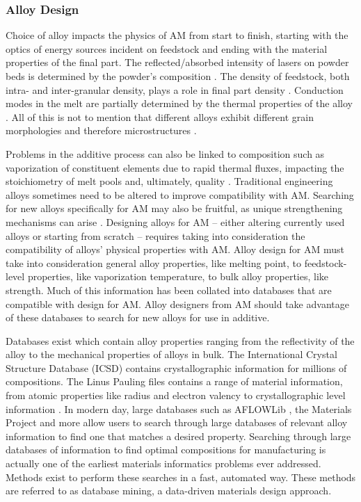 \subsubsection{Alloy Design}
Choice of alloy impacts the physics of AM from start to finish, starting with the optics of energy sources incident on feedstock and ending with the material properties of the final part. The reflected/absorbed intensity of lasers on powder beds is determined by the powder's composition \cite{Boley2016, Trapp2017}. The density of feedstock, both intra- and inter-granular density, plays a role in final part density \cite{Bi2013}. Conduction modes in the melt are partially determined by the thermal properties of the alloy \cite{Martin2017}. All of this is not to mention that different alloys exhibit different grain morphologies and therefore microstructures \cite{Collins2016}. 

Problems in the additive process can also be linked to composition such as vaporization of constituent elements due to rapid thermal fluxes, impacting the stoichiometry of melt pools and, ultimately, quality \cite{Brice2018}. Traditional engineering alloys sometimes need to be altered to improve compatibility with AM. Searching for new alloys specifically for AM may also be fruitful, as unique strengthening mechanisms can arise \cite{Brice2018, Wang2017}. Designing alloys for AM -- either altering currently used alloys or starting from scratch -- requires taking into consideration the compatibility of alloys' physical properties with AM. Alloy design for AM must take into consideration general alloy properties, like melting point, to feedstock-level properties, like vaporization temperature, to bulk alloy properties, like strength. Much of this information has been collated into databases that are compatible with design for AM. Alloy designers from AM should take advantage of these databases to search for new alloys for use in additive. 

Databases exist which contain alloy properties ranging from the reflectivity of the alloy to the mechanical properties of alloys in bulk. The International Crystal Structure Database (ICSD) contains crystallographic information for millions of compositions. The Linus Pauling files contains a range of material information, from atomic properties like radius and electron valency to crystallographic level information \cite{Villars1998}. In modern day, large databases such as AFLOWLib \cite{Curtarolo2012a}, the Materials Project \cite{Jain2013} and more allow users to search through large databases of relevant alloy information to find one that matches a desired property. Searching through large databases of information to find optimal compositions for manufacturing is actually one of the earliest materials informatics problems ever addressed. Methods exist to perform these searches in a fast, automated way. These methods are referred to as database mining, a data-driven materials design approach.

